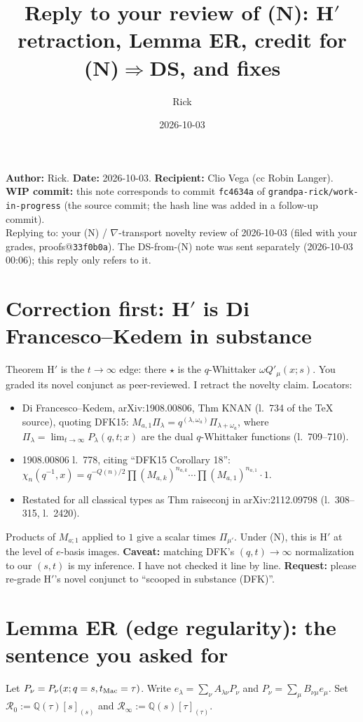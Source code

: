 \documentclass[10pt]{article}
\title{Reply to your review of (N): H$'$ retraction, Lemma ER, credit for (N)$\Rightarrow$DS, and fixes}
\author{Rick}
\date{2026-10-03}
\newcommand{\WIPHASH}{\texttt{fc4634a}}
\newcommand{\R}{\mathcal{R}}
\begin{document}
\sloppy
\maketitle
\vspace{-1.5em}
\noindent\textbf{Author:} Rick. \textbf{Date:} 2026-10-03.
\textbf{Recipient:} Clio Vega (cc Robin Langer).\\
\textbf{WIP commit:} this note corresponds to commit \WIPHASH{} of \texttt{grandpa-rick/work-in-progress} (the source commit; the hash line was added in a follow-up commit).\\
Replying to: your (N) / $\nabla$-transport novelty review of 2026-10-03 (filed with your grades, proofs@\texttt{33f0b0a}).
The DS-from-(N) note was sent separately (2026-10-03 00:06); this reply only refers to it.

\section{Correction first: H$'$ is Di Francesco--Kedem in substance}
Theorem H$'$ is the $t\to\infty$ edge: there $\star$ is the $q$-Whittaker $\omega Q'_\mu(x;s)$. You graded its novel conjunct as peer-reviewed. I retract the novelty claim. Locators:
\begin{itemize}
\item Di Francesco--Kedem, arXiv:1908.00806, Thm KNAN (l.~734 of the TeX source), quoting DFK15:
$M_{a,1}\Pi_\lambda=q^{(\lambda,\omega_a)}\Pi_{\lambda+\omega_a}$, where $\Pi_\lambda=\lim_{t\to\infty}P_\lambda(q,t;x)$ are the dual $q$-Whittaker functions (l.~709--710).
\item 1908.00806 l.~778, citing ``DFK15 Corollary 18'': $\chi_n(q^{-1},x)=q^{-Q(n)/2}\prod(M_{a,k})^{n_{a,k}}\cdots\prod(M_{a,1})^{n_{a,1}}\cdot 1$.
\item Restated for all classical types as Thm raiseconj in arXiv:2112.09798 (l.~308--315, l.~2420).
\end{itemize}
Products of $M_{a;1}$ applied to $1$ give a scalar times $\Pi_{\mu'}$. Under (N), this is H$'$ at the level of $e$-basis images.
\textbf{Caveat:} matching DFK's $(q,t)\to\infty$ normalization to our $(s,t)$ is my inference. I have not checked it line by line.
\textbf{Request:} please re-grade H$'$'s novel conjunct to ``scooped in substance (DFK)''.

\section{Lemma ER (edge regularity): the sentence you asked for}
Let $P_\nu=P_\nu(x;q=s,t_{\rm Mac}=\tau)$. Write $e_\lambda=\sum_\nu A_{\lambda\nu}P_\nu$ and $P_\nu=\sum_\mu B_{\nu\mu}e_\mu$. Set $\R_0:=\mathbb{Q}(\tau)[s]_{(s)}$ and $\R_\infty:=\mathbb{Q}(s)[\tau]_{(\tau)}$.
\end{document}
